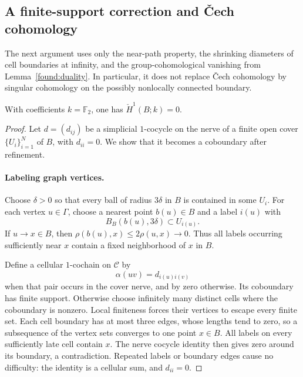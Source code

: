\subsection{A finite-support correction and \v{C}ech cohomology}

The next argument uses only the near-path property, the shrinking
diameters of cell boundaries at infinity, and the group-cohomological
vanishing from Lemma~\ref{found:duality}.  In particular, it does
not replace \v{C}ech cohomology by singular cohomology on the possibly
nonlocally connected boundary.

\begin{proposition}\label{topo:cech}
With coefficients $k=\mathbb F_2$, one has $\check H^1(B;k)=0$.
\end{proposition}

\begin{proof}
Let $d=(d_{ij})$ be a simplicial $1$-cocycle on the nerve of a finite open
cover $\{U_i\}_{i=1}^N$ of $B$, with $d_{ii}=0$.  We show that it becomes a
coboundary after refinement.

\paragraph{Labeling graph vertices.}
Choose $\delta>0$ so that every ball of radius $3\delta$ in $B$ is
contained in some $U_i$.  For each vertex $u\in\Gamma$, choose a nearest
point $b(u)\in B$ and a label $i(u)$ with
\[
 B_B(b(u),3\delta)\subset U_{i(u)}.
\]
If $u\to x\in B$, then
$\rho(b(u),x)\le2\rho(u,x)\to0$.  Thus all labels occurring sufficiently
near $x$ contain a fixed neighborhood of $x$ in $B$.

Define a cellular $1$-cochain on $\mathcal C$ by
\[
 \alpha(uv)=d_{i(u)i(v)}
\]
when that pair occurs in the cover nerve, and by zero otherwise.
Its coboundary has finite support.  Otherwise choose infinitely many
distinct cells where the coboundary is nonzero.  Local finiteness forces
their vertices to escape every finite set.  Each cell boundary has at
most three edges, whose lengths tend to zero, so a subsequence of the
vertex sets converges to one point $x\in B$.  All labels on every
sufficiently late cell contain $x$.  The nerve cocycle identity then
gives zero around its boundary, a contradiction.  Repeated labels or
boundary edges cause no difficulty: the identity is a cellular sum,
and $d_{ii}=0$.


\end{proof}
